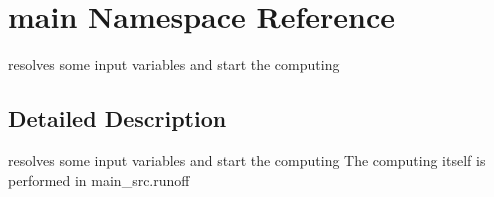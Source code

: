 \hypertarget{namespacemain}{\section{main Namespace Reference}
\label{namespacemain}
}


resolves some input variables and start the computing  




\subsection{Detailed Description}
resolves some input variables and start the computing The computing itself is performed in main\-\_\-src.\-runoff 